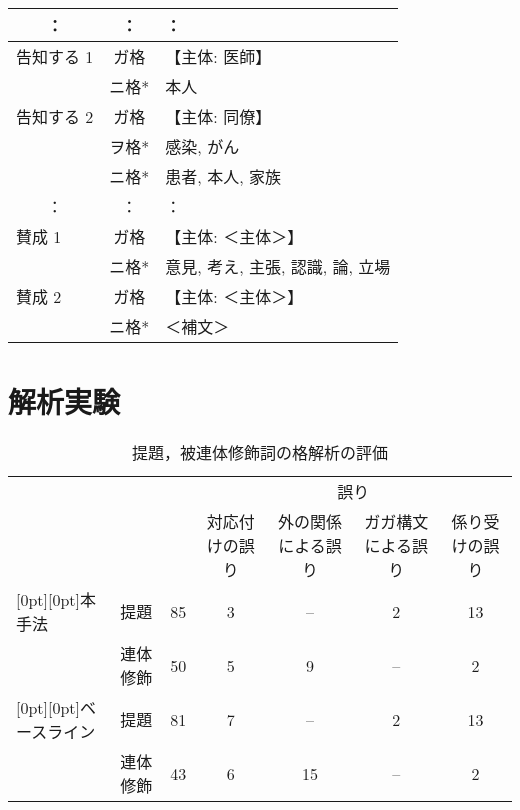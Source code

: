 \begin{table*}[tbp]
\begin{center}
\begin{tabular}{l|c|l}
   \multicolumn{1}{c|}{：} & \multicolumn{1}{c|}{：} & ： \\ \hline\hline
   告知する 1 & ガ格    & 【主体: 医師】 \\
          & ニ格*   & 本人 \\ \hline
   告知する 2 & ガ格    & 【主体: 同僚】\\
          & ヲ格*   & 感染, がん \\
          & ニ格*   & 患者, 本人, 家族 \\ \hline
   \multicolumn{1}{c|}{：} & \multicolumn{1}{c|}{：} & ： \\ \hline\hline
   賛成 1 & ガ格 & 【主体: ＜主体＞】 \\
          & ニ格* & 意見, 考え, 主張, 認識, 論, 立場 \\ \hline
   賛成 2 & ガ格 & 【主体: ＜主体＞】 \\
          & ニ格* & ＜補文＞ \\ \hline
  \end{tabular}
 \end{center}
\end{table*}


\section{解析実験}

\begin{table}[tbp]
 \caption{提題，被連体修飾詞の格解析の評価}
 \label{格解析の評価}
  \begin{center} \small
   \begin{tabular}{l|c|c|c|c|c|c} \hline
    \multicolumn{1}{l}{} & & & \multicolumn{4}{c}{誤り} \\ \cline{4-7}
    \multicolumn{1}{l}{} & & \raisebox{0.5zh}{正解} & \begin{minipage}{5zw}対応付けの誤り\end{minipage} &  \begin{minipage}{5zw}外の関係による誤り\end{minipage} & \begin{minipage}{5zw}ガガ構文による誤り\end{minipage} &
    \begin{minipage}{5zw}
     係り受けの誤り
    \end{minipage} \\ \hline
    \raisebox{-0.8zh}[0pt][0pt]{本手法}       & 提題 & 85 & 3 & -- & 2 & 13 \\
    & 連体修飾 & 50 & 5 &  9 &  -- &  2 \\ \hline
    \raisebox{-0.8zh}[0pt][0pt]{ベースライン} & 提題 & 81 & 7 & -- & 2 & 13 \\
    & 連体修飾 & 43 & 6 & 15 &  -- &  2 \\ \hline
   \end{tabular}
  \end{center}
\end{table}

